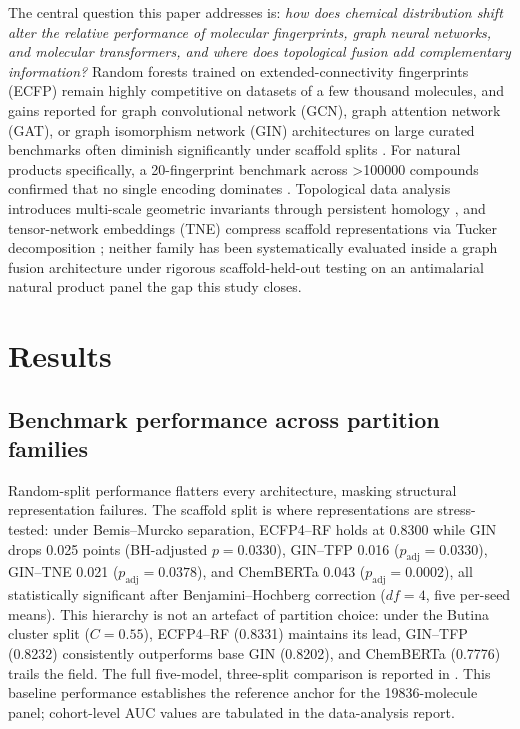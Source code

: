 \documentclass[11pt,a4paper]{article}
\begin{document}
The central question this paper addresses is: \emph{how does chemical distribution shift alter the relative performance of molecular fingerprints, graph neural networks, and molecular transformers, and where does topological fusion add complementary information?} Random forests trained on extended-connectivity fingerprints (ECFP) remain highly competitive on datasets of a few thousand molecules, and gains reported for graph convolutional network (GCN), graph attention network (GAT), or graph isomorphism network (GIN) architectures on large curated benchmarks often diminish significantly under scaffold splits \citep{guo_ding_2026,wu_molnet_2018,benchmark_pretrained_2025,vantilborg2026edge}. For natural products specifically, a \num{20}-fingerprint benchmark across \num{>100000} compounds confirmed that no single encoding dominates \citep{boldini2024}. Topological data analysis introduces multi-scale geometric invariants through persistent homology \citep{tda_review_2025,su2026tdlreview,docal2026tdlvs}, and tensor-network embeddings (TNE) compress scaffold representations via Tucker decomposition \citep{tn_efficient_2026}; neither family has been systematically evaluated inside a graph fusion architecture under rigorous scaffold-held-out testing on an antimalarial natural product panel the gap this study closes.

\section{Results}

\subsection{Benchmark performance across partition families}

Random-split performance flatters every architecture, masking structural representation failures. The scaffold split is where representations are stress-tested: under Bemis--Murcko separation, ECFP4--RF holds at \num{0.8300} while GIN drops \num{0.025} points (BH-adjusted $p = \num{0.0330}$), GIN--TFP \num{0.016} ($p_{\text{adj}} = \num{0.0330}$), GIN--TNE \num{0.021} ($p_{\text{adj}} = \num{0.0378}$), and ChemBERTa \num{0.043} ($p_{\text{adj}} = \num{0.0002}$), all statistically significant after Benjamini--Hochberg correction ($df=\num{4}$, five per-seed means). This hierarchy is not an artefact of partition choice: under the Butina cluster split ($C=\num{0.55}$), ECFP4--RF (\num{0.8331}) maintains its lead, GIN--TFP (\num{0.8232}) consistently outperforms base GIN (\num{0.8202}), and ChemBERTa (\num{0.7776}) trails the field. The full five-model, three-split comparison is reported in . This baseline performance establishes the reference anchor for the \num{19836}-molecule panel; cohort-level AUC values are tabulated in the data-analysis report.
\end{document}
